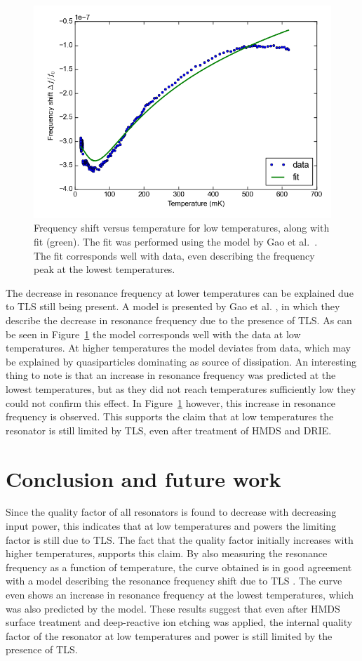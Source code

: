 \begin{figure}[h]
    \centering
    \includegraphics[width=.7\textwidth]{Figures/DRIE/Temperature increase tracking - f0 vs T with fit.png}
    \caption{Frequency shift versus temperature for low temperatures, along with fit (green). The fit was performed using the model by Gao et al.~\cite{gao2008experimental}. The fit corresponds well with data, even describing the frequency peak at the lowest temperatures.}
    \label{fig:f0_vs_T_with_fit}
\end{figure}

The decrease in resonance frequency at lower temperatures can be explained due to TLS still being present. A model is presented by Gao et al. \cite{gao2008experimental}, in which they describe the decrease in resonance frequency due to the presence of TLS. As can be seen in Figure~\ref{fig:f0_vs_T_with_fit} the model corresponds well with the data at low temperatures. At higher temperatures the model deviates from data, which may be explained by quasiparticles dominating as source of dissipation. An interesting thing to note is that an increase in resonance frequency was predicted at the lowest temperatures, but as they did not reach temperatures sufficiently low they could not confirm this effect. In Figure~\ref{fig:f0_vs_T_with_fit} however, this increase in resonance frequency is observed. This supports the claim that at low temperatures the resonator is still limited by TLS, even after treatment of HMDS and DRIE.



\chapter{Conclusion and future work}

Since the quality factor of all resonators is found to decrease with decreasing input power, this indicates that at low temperatures and powers the limiting factor is still due to TLS. The fact that the quality factor initially increases with higher temperatures, supports this claim. By also measuring  the resonance frequency as a function of temperature, the curve obtained is in good agreement with a model describing the resonance frequency shift due to TLS \cite{gao2008experimental}. The curve even shows an increase in resonance frequency at the lowest temperatures, which was also predicted by the model. These results suggest that even after HMDS surface treatment and deep-reactive ion etching was applied, the internal quality factor of the resonator at low temperatures and power is still limited by the presence of TLS.

